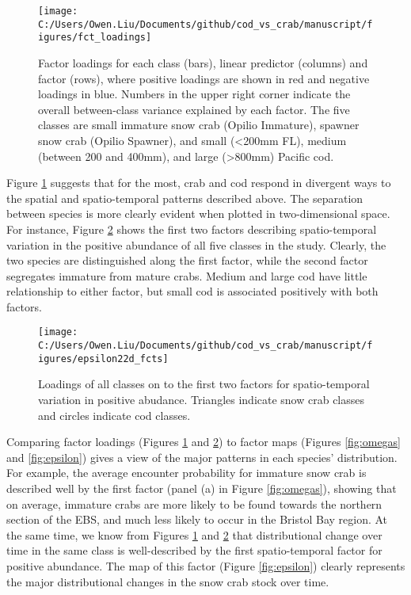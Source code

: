 \documentclass[11pt,]{article}
\begin{document}
\begin{figure}
\texttt{[image: C:/Users/Owen.Liu/Documents/github/cod\_vs\_crab/manuscript/figures/fct\_loadings]} \caption{Factor loadings for each class (bars), linear predictor (columns) and factor (rows), where positive loadings are shown in red and negative loadings in blue. Numbers in the upper right corner indicate the overall between-class variance explained by each factor. The five classes are small immature snow crab (Opilio Immature), spawner snow crab (Opilio Spawner), and small (<200mm FL), medium (between 200 and 400mm), and large (>800mm) Pacific cod.}\label{fig:loads}
\end{figure}

Figure \ref{fig:loads} suggests that for the most, crab and cod respond in divergent ways to the spatial and spatio-temporal patterns described above. The separation between species is more clearly evident when plotted in two-dimensional space. For instance, Figure \ref{fig:2dfcts} shows the first two factors describing spatio-temporal variation in the positive abundance of all five classes in the study. Clearly, the two species are distinguished along the first factor, while the second factor segregates immature from mature crabs. Medium and large cod have little relationship to either factor, but small cod is associated positively with both factors.

\begin{figure}
\texttt{[image: C:/Users/Owen.Liu/Documents/github/cod\_vs\_crab/manuscript/figures/epsilon22d\_fcts]} \caption{Loadings of all classes on to the first two factors for spatio-temporal variation in positive abudance. Triangles indicate snow crab classes and circles indicate cod classes.}\label{fig:2dfcts}
\end{figure}

Comparing factor loadings (Figures \ref{fig:loads} and \ref{fig:2dfcts}) to factor maps (Figures \ref{fig:omegas} and \ref{fig:epsilon}) gives a view of the major patterns in each species' distribution. For example, the average encounter probability for immature snow crab is described well by the first factor (panel (a) in Figure \ref{fig:omegas}), showing that on average, immature crabs are more likely to be found towards the northern section of the EBS, and much less likely to occur in the Bristol Bay region. At the same time, we know from Figures \ref{fig:loads} and \ref{fig:2dfcts} that distributional change over time in the same class is well-described by the first spatio-temporal factor for positive abundance. The map of this factor (Figure \ref{fig:epsilon}) clearly represents the major distributional changes in the snow crab stock over time.
\end{document}
